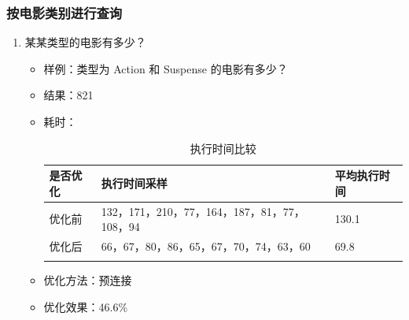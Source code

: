 \documentclass{ctexrep}
\begin{document}
	\subsubsection{按电影类别进行查询}
	    \begin{enumerate}
	        \item 某某类型的电影有多少？
    	        \begin{itemize}
    	            \item 样例：类型为 Action 和 Suspense 的电影有多少？
    	            \item 结果：821
    	            \item 耗时：
    	                \begin{longtable}{l|p{5cm}|l}
    	                    \hline
    	                    是否优化 & 执行时间采样 & 平均执行时间\\
    	                    \hline
    	                    \hline
    	                    优化前 & 132，171，210，77，164，187，81，77，108，94 & 130.1\\
    	                    优化后 & 66，67，80，86，65，67，70，74，63，60 & 69.8\\
    	                    \hline
    	                    \caption{执行时间比较}
    	                \end{longtable}
    	            \item 优化方法：预连接
    	            \item 优化效果：46.6\%
    	        \end{itemize}
	    \end{enumerate}
\end{document}
